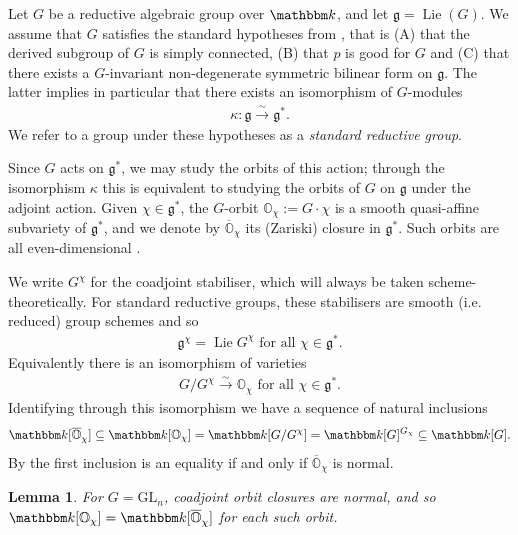 \documentclass[twoside,12pt,reqno]{amsart}
\newtheorem{Lemma}[Theorem]{Lemma}
\theoremstyle{remark}
\numberwithin{equation}{section}
\def\k{{\mathbbm k}}
\def\Lie{\operatorname{Lie}}
\def\O{{\mathbb O}}
\def\cO{{\overline{\mathbb O}}}
\def\GL{\mathrm{GL}}
\def\g{{\mathfrak g}}
\begin{document}
	Let $G$ be a reductive algebraic group over $\k$, and let $\g=\Lie(G)$. We assume that $G$ satisfies the standard hypotheses from \cite[]{JaLA}, that is (A) that the derived subgroup of $G$ is simply connected, (B) that $p$ is good for $G$ and (C) that there exists a $G$-invariant non-degenerate symmetric bilinear form on $\g$. The latter implies in particular that there exists an isomorphism of $G$-modules
	\begin{eqnarray}
    \label{eq:kappa}
	\kappa:\g\xrightarrow{\sim}\g^{*}.
	\end{eqnarray}
    We refer to a group under these hypotheses as a {\it standard reductive group}.
    
		Since $G$ acts on $\g^{*}$, we may study the orbits of this action; through the isomorphism $\kappa$ this is equivalent to studying the orbits of $G$ on $\g$ under the adjoint action. Given $\chi\in\g^{*}$, the $G$-orbit $\O_\chi:=G\cdot\chi$ is a smooth quasi-affine subvariety of $\g^{*}$, and we denote by $\cO_\chi$ its (Zariski) closure in $\g^{*}$. Such orbits are all even-dimensional \cite[]{JaNO}. 
		
		We write $G^\chi$ for the coadjoint stabiliser, which will always be taken scheme-theoretically. For standard reductive groups, these stabilisers are smooth (i.e. reduced) group schemes \cite[]{JaNO} and so 
	\begin{eqnarray}
	\label{L:smoothstabilisers}
	\g^\chi = \Lie G^\chi \text{ for all } \chi \in \g^*.
	\end{eqnarray}
	Equivalently \cite[]{JaNO} there is an isomorphism of varieties 
\begin{eqnarray}
\label{eq:quotientisorbit}
G/G^\chi\xrightarrow{\sim}\O_\chi \text{ for all } \chi \in \g^*.
\end{eqnarray}	
Identifying through this isomorphism we have a sequence of natural inclusions
\begin{eqnarray}
\label{eq:naturalinclusions}
    \k[\cO_\chi]\subseteq \k[\O_\chi]= \k[G/G^\chi] = \k[G]^{G_\chi} \subseteq \k[G].
\end{eqnarray}
By \cite[Corollary 8.3]{JaNO} the first inclusion is an equality if and only if $\cO_\chi$ is normal.
\begin{Lemma}
\cite{Do}
\label{L:normalorbits}
For $G = \GL_n$, coadjoint orbit closures are normal, and so
$\k[\O_\chi] =  \k[\overline{\O}_\chi]$ for each such orbit.
\end{Lemma}
\end{document}
